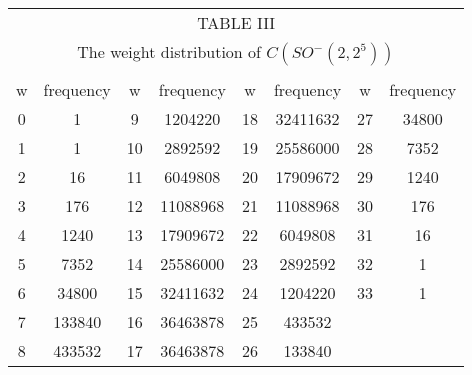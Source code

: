 \documentclass[a4,12pt]{elsart}
\begin{document}
\begin{table}[!htp]
\begin{center}
\begin{tabular}{c c c c c c c c }
\multicolumn{8}{c}{TABLE III} \\
\multicolumn{8}{c}{The weight distribution of $C(SO^{-}(2,2^{5}))$} \\
\\
\hline
w & frequency & w& frequency & w& frequency &w& frequency\\[0.5pt]
\hline
  0  &      1   &    9  &   1204220   &     18  &    32411632 &    27 &  34800\\
  1  &      1   &    10 &    2892592  &     19  &    25586000 &   28  &  7352\\
  2  &     16   &    11 &    6049808  &     20  &    17909672 &    29 &  1240\\
  3  &    176   &    12 &    11088968 &     21  &    11088968 &    30 &  176\\
  4  &   1240   &    13 &    17909672 &     22  &     6049808 &    31 &  16\\
  5  &   7352   &    14 &    25586000 &     23  &    2892592  &   32  &  1\\
  6  &  34800   &    15 &    32411632 &     24  &    1204220  &   33  &  1\\
  7  & 133840   &    16 &    36463878 &     25  &    433532\\
  8  & 433532   &    17 &    36463878 &     26  &    133840\\
 \hline
\end{tabular}
\end{center}
\end{table}
\end{document}
